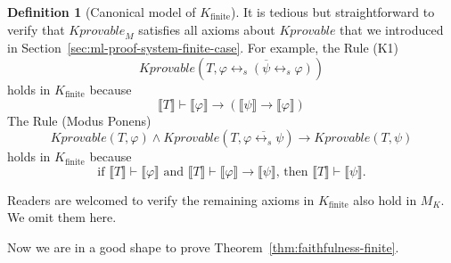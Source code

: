 \documentclass[UTF8,11pt]{article}
\newcounter{thmcounter}
\theoremstyle{plain}
\theoremstyle{definition}
\newtheorem{definition} [thmcounter]{Definition}
\theoremstyle{remark}
\newcommand{\Bracket}[1]{\llbracket#1\rrbracket}
\newcommand{\Kfinite}{{K_\text{finite}}}
\newcommand{\Kdeduce}{\mathit{Kprovable}}
\begin{document}
\begin{definition}[Canonical model of $\Kfinite$]
	It is tedious but straightforward to verify that $\Kdeduce_M$ satisfies all 
	axioms about $\Kdeduce$ that we introduced in 
	Section~\cref{sec:ml-proof-system-finite-case}.
	For example, the Rule (K1)
	\begin{equation*}
	\Kdeduce(T, \overline{\varphi \leftrightarrow_s (\psi \leftrightarrow_s 
	\varphi)})
	\end{equation*}
	holds in $\Kfinite$ because
	$$\Bracket{T} \vdash \Bracket{\varphi} \to (\Bracket{\psi} \to 
	\Bracket{\varphi})$$
	The Rule (Modus Ponens)
	\begin{equation*}
	\Kdeduce(T, \varphi) \wedge \Kdeduce(T, \overline{\varphi \leftrightarrow_s 
	\psi}) \to 
	\Kdeduce(T, \psi)
	\end{equation*}
	holds in $\Kfinite$ because
	$$\text{if $\Bracket{T} \vdash \Bracket{\varphi}$ and $\Bracket{T} \vdash 
	\Bracket{\varphi} \to \Bracket{\psi}$, then $\Bracket{T} \vdash 
	\Bracket{\psi}$}.$$
	
	Readers are welcomed to verify the remaining axioms in $\Kfinite$ also hold 
	in $M_K$.
	We omit them here.
	
	
\end{definition}


Now we are in a good shape to prove Theorem~\ref{thm:faithfulness-finite}.
\end{document}
